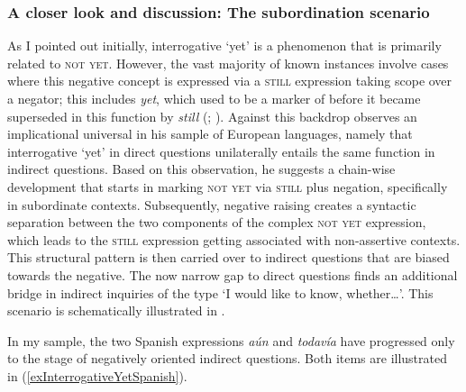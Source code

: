\subsubsection{A closer look and discussion: The subordination scenario}
As I pointed out initially, interrogative \lq yet\rq{ }is a phenomenon that is primarily related to \textsc{not yet}. However, the vast majority of known instances involve cases where this negative concept is expressed via a \textsc{still} expression taking scope over a negator; this includes  \textit{yet}, which used to be a marker of  before it became superseded in this function by \textit{still} (\cite[146–148]{Koenig1991}; \cite{KoenigTraugott1982}). Against this backdrop \textcite{vanderAuwera1998} observes an implicational universal in his sample of European languages, namely that interrogative \lq yet\rq{ }in direct questions unilaterally entails the same function in indirect questions. Based on this observation, he suggests a chain-wise development that starts in marking \textsc{not yet} via \textsc{still} plus negation, specifically in subordinate contexts. Subsequently, negative raising creates a syntactic separation between the two components of the complex \textsc{not yet} expression, which leads to the \textsc{still} expression getting associated with non-assertive contexts. This structural pattern is then carried over to indirect questions that are biased towards the negative. The now narrow gap to direct questions finds an additional bridge in indirect inquiries of the type \lq I would like to know, whether…'. This scenario is schematically illustrated in .

In my sample, the two Spanish expressions \textit{aún} and \textit{todavía} have progressed only to the stage of negatively oriented indirect questions. Both items are illustrated in (\ref{exInterrogativeYetSpanish}).


